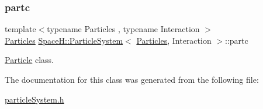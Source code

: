 \subsubsection{\texorpdfstring{partc}{partc}}
{\footnotesize\ttfamily template$<$typename Particles , typename Interaction $>$ \\
\mbox{\hyperlink{struct_space_h_1_1_particles}{Particles}} \mbox{\hyperlink{class_space_h_1_1_particle_system}{Space\+H\+::\+Particle\+System}}$<$ \mbox{\hyperlink{struct_space_h_1_1_particles}{Particles}}, Interaction $>$\+::partc\hspace{0.3cm}{\ttfamily [protected]}}



\mbox{\hyperlink{struct_space_h_1_1_particle}{Particle}} class. 



The documentation for this class was generated from the following file\+:\begin{DoxyCompactItemize}
\item 
\mbox{\hyperlink{particle_system_8h}{particle\+System.\+h}}\end{DoxyCompactItemize}
